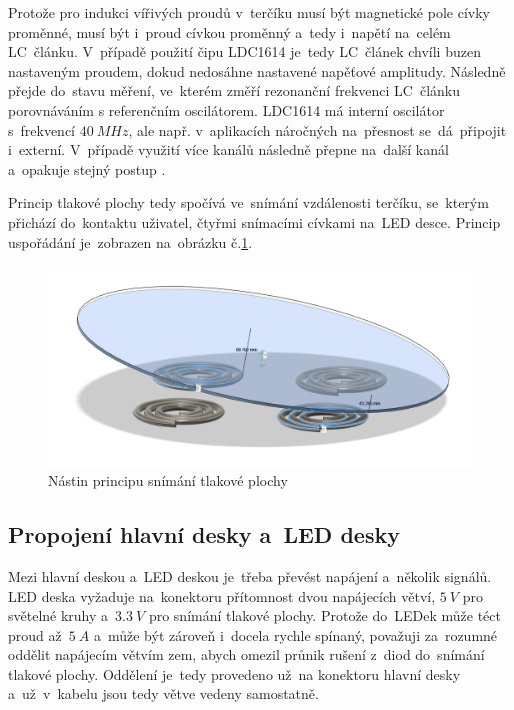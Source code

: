 Protože pro indukci vířivých proudů v~terčíku musí být magnetické pole cívky proměnné, musí být i~proud cívkou proměnný a~tedy i~napětí na~celém LC~článku.
V~případě použití čipu LDC1614 je~tedy LC~článek chvíli buzen nastaveným proudem, dokud nedosáhne nastavené napěťové amplitudy.
Následně přejde do~stavu měření, ve~kterém změří rezonanční frekvenci LC~článku porovnáváním s referenčním oscilátorem.
LDC1614 má interní oscilátor s~frekvencí \(40~MHz\), ale např. v~aplikacích náročných na~přesnost se~dá~připojit i~externí. 
V~případě využití více kanálů následně přepne na~další kanál a~opakuje stejný postup \cite{LDC1614}.

Princip tlakové plochy tedy spočívá ve~snímání vzdálenosti terčíku, se~kterým přichází do~kontaktu uživatel, čtyřmi snímacími cívkami na~LED desce.
Princip uspořádání je~zobrazen na~obrázku č.\ref{fig:nastin-tlakovky}.

\cite{LDC1614SensorDesign} \cite{SkriptaMMS}

\begin{figure}[h!]
    \centering
    \includegraphics[width=\textwidth]{text/PraktickaCast/img/naklonena-tlakovka.png}
    \caption{Nástin principu snímání tlakové plochy}
    \label{fig:nastin-tlakovky}
\end{figure}

\subsection{Propojení hlavní desky a~LED desky}
Mezi hlavní deskou a~LED deskou je~třeba převést napájení a~několik signálů.
LED deska vyžaduje na~konektoru přítomnost dvou napájecích větví, \(5~V\) pro světelné kruhy a~\(3.3~V\) pro snímání tlakové plochy.
Protože do~LEDek může téct proud až~\(5~A\) a~může být zároveň i~docela rychle spínaný, považuji za~rozumné oddělit napájecím větvím zem, abych omezil průnik rušení z~diod do~snímání tlakové plochy.
Oddělení je~tedy provedeno už~na konektoru hlavní desky a~už~v~kabelu jsou tedy větve vedeny samostatně.

